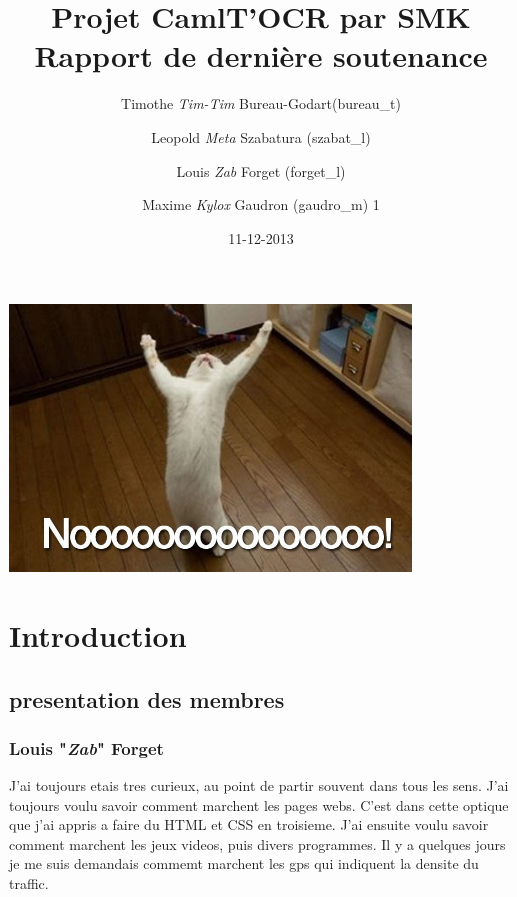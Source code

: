 \documentclass[12pt]{article}
\title{Projet CamlT'OCR par SMK \\ Rapport de dernière soutenance}
\date{11-12-2013}
\author{
  Timothe \textit{Tim-Tim} Bureau-Godart(bureau\_t) \and
  Leopold \textit{Meta} Szabatura (szabat\_l) \and
  Louis \textit{Zab} Forget (forget\_l) \and
  Maxime \textit{Kylox} Gaudron (gaudro\_m)
1      }
\begin{document}
\maketitle
\newpage
\tableofcontents
\newpage
\hspace*{0mm}\vfill
\begin{center}
  \includegraphics[width=0.80\textwidth]{Nooooo.jpg}
\end{center}
\vfill\hspace*{0mm}
\newpage
\section{Introduction}
\subsection{presentation des membres}
\subsubsection{Louis "\textit{Zab}" Forget}
J'ai toujours etais tres curieux, au point de partir souvent dans tous les sens. J'ai toujours voulu savoir comment marchent les pages webs. C'est dans cette optique que j'ai appris a faire du HTML et CSS en troisieme. J'ai ensuite voulu savoir comment marchent les jeux videos, puis divers programmes. Il y a quelques jours je me suis demandais commemt marchent les gps qui indiquent la densite du traffic.
\end{document}
